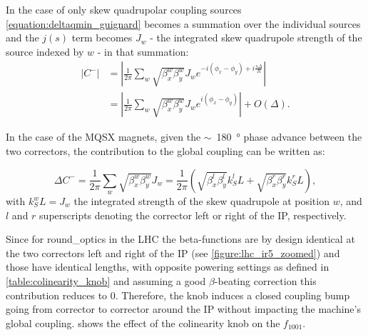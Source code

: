 In the case of only skew quadrupolar coupling sources \cref{equation:deltaqmin_guignard} becomes a summation over the individual sources and the \(j(s)\) term becomes \(J_w\) - the integrated skew quadrupole strength of the source indexed by \(w\) - in that summation:
\begin{equation}
    \begin{aligned}
        \left| C^{-} \right| &= \left| \frac{1}{2 \pi} \sum_w \sqrt{\beta_x^w \beta_y^w} J_w e^{-i \left( \phi_x-\phi_y \right) + i \frac{s \Delta}{R}} \right| \\
                             &= \left| \frac{1}{2 \pi} \sum_w \sqrt{\beta_x^w \beta_y^w} J_w e^{i \left( \phi_x-\phi_y \right)} \right| + O(\Delta) .
    \end{aligned}
    \label{equation:deltaqmin_guignard_singular}
\end{equation}

In the case of the MQSX magnets, given the \(\sim\)~\qty{180}{\degree} phase advance between the two correctors, the contribution to the global coupling can be written as:

\begin{equation}
    \Delta C^{-} = \frac{1}{2 \pi} \sum_w \sqrt{\beta_x^w \beta_y^w} J_w = \frac{1}{2 \pi} \left( \sqrt{\beta_x^l \beta_y^l} k_S^l L + \sqrt{\beta_x^r \beta_y^r} k_S^r L \right) ,
    \label{equation:deltaqmin_only_mqsxs}
\end{equation}
with \(k_S^w L = J_w\) the integrated strength of the skew quadrupole at position \(w\), and \(l\) and \(r\) superscripts denoting the corrector left or right of the IP, respectively.

Since for \gls{round_optics} in the LHC the \glspl{beta-function} are by design identical at the two correctors left and right of the IP (see \cref{figure:lhc_ir5_zoomed}) and those have identical lengths, with opposite powering settings as defined in \cref{table:colinearity_knob} and assuming a good \(\beta\)-beating correction this contribution reduces to \num{0}.
Therefore, the knob induces a closed coupling bump going from corrector to corrector around the IP without impacting the machine's global coupling.
 shows the effect of the colinearity knob on the \(f_{1001}\).

